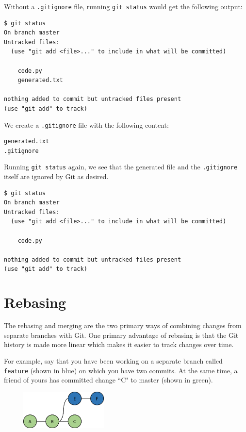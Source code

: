 \documentclass{amsart}
\begin{document}
Without a \texttt{.gitignore} file, running \texttt{git status} would get the following output:

\begin{verbatim}
$ git status
On branch master
Untracked files:
  (use "git add <file>..." to include in what will be committed)
  
    code.py
    generated.txt

nothing added to commit but untracked files present
(use "git add" to track)
\end{verbatim}

We create a \texttt{.gitignore} file with the following content:

\begin{verbatim}
generated.txt
.gitignore
\end{verbatim}

Running \texttt{git status} again, we see that the generated file and the \texttt{.gitignore} itself are ignored by Git as desired.

\begin{verbatim}
$ git status
On branch master
Untracked files:
  (use "git add <file>..." to include in what will be committed)
  
    code.py

nothing added to commit but untracked files present
(use "git add" to track)
\end{verbatim}

\newpage
\section*{Rebasing}

The rebasing and merging are the two primary ways of combining changes from separate branches with Git.  One primary advantage of rebasing is that the Git history is made more linear which makes it easier to track changes over time.

For example, say that you have been working on a separate branch called \texttt{feature} (shown in blue) on which you have two commits.  At the same time, a friend of yours has committed change ``C" to master (shown in green).

\begin{figure}[h]
\center
\includegraphics[height=2cm]{feature}
\end{figure}
\end{document}
